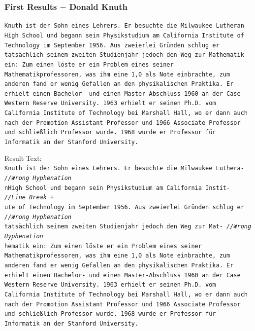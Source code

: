 \documentclass{beamer}
\begin{document}
\begin{frame}
\frametitle{First Results $-$ Donald Knuth}
\texttt{\tiny Knuth ist der Sohn eines Lehrers. Er besuchte die Milwaukee Lutheran \\
High School und begann sein Physikstudium am California Institute of \\
Technology im September 1956. Aus zweierlei Gründen schlug er \\
tatsächlich seinem zweiten Studienjahr jedoch den Weg zur Mathematik \\
ein: Zum einen löste er ein Problem eines seiner \\
Mathematikprofessoren, was ihm eine 1,0 als Note einbrachte, zum \\
anderen fand er wenig Gefallen an den physikalischen Praktika. Er \\
erhielt einen Bachelor- und einen Master-Abschluss 1960 an der Case \\
Western Reserve University. 1963 erhielt er seinen Ph.D. vom \\
California Institute of Technology bei Marshall Hall, wo er dann auch \\
nach der Promotion Assistant Professor und 1966 Associate Professor \\
und schließlich Professor wurde. 1968 wurde er Professor für \\
Informatik an der Stanford University.\\}

Result Text: \\

\texttt{\scriptsize{K}\tiny nuth ist der Sohn eines Lehrers. Er besuchte die Milwaukee Luthera- \hskip 18pt \emph{//Wrong Hyphenation} \\
\scriptsize{n}\tiny  High School und begann sein Physikstudium am California Instit- \hskip 33pt \emph{//Line Break +} \\
\scriptsize{u}\tiny te of Technology im September 1956. Aus zweierlei Gründen schlug er \hskip 23pt \emph{//Wrong Hyphenation} \\
\scriptsize{t}\tiny atsächlich seinem zweiten Studienjahr jedoch den Weg zur Mat- \hskip 39pt \emph{//Wrong Hyphenation} \\
\scriptsize{h}\tiny ematik ein: Zum einen löste er ein Problem eines seiner \\
Mathematikprofessoren, was ihm eine 1,0 als Note einbrachte, zum \\
anderen fand er wenig Gefallen an den physikalischen Praktika. Er \\
erhielt einen Bachelor- und einen Master-Abschluss 1960 an der Case \\
Western Reserve University. 1963 erhielt er seinen Ph.D. vom \\
California Institute of Technology bei Marshall Hall, wo er dann auch \\
nach der Promotion Assistant Professor und 1966 Associate Professor \\
und schließlich Professor wurde. 1968 wurde er Professor für \\
Informatik an der Stanford University. \\}
\end{frame}
\end{document}
